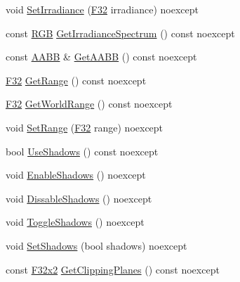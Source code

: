 \begin{DoxyCompactItemize}
void \mbox{\hyperlink{classmage_1_1rendering_1_1_directional_light_af8570b18bfb807492317e4a98f5c7ba6}{Set\+Irradiance}} (\mbox{\hyperlink{namespacemage_aa97e833b45f06d60a0a9c4fc22ae02c0}{F32}} irradiance) noexcept
\item 
const \mbox{\hyperlink{structmage_1_1_r_g_b}{R\+GB}} \mbox{\hyperlink{classmage_1_1rendering_1_1_directional_light_a3a99d3d63a686f8bc587015115a85a81}{Get\+Irradiance\+Spectrum}} () const noexcept
\item 
const \mbox{\hyperlink{classmage_1_1_a_a_b_b}{A\+A\+BB}} \& \mbox{\hyperlink{classmage_1_1rendering_1_1_directional_light_a0fdc09e70e3218f69de15c33436fc7ac}{Get\+A\+A\+BB}} () const noexcept
\item 
\mbox{\hyperlink{namespacemage_aa97e833b45f06d60a0a9c4fc22ae02c0}{F32}} \mbox{\hyperlink{classmage_1_1rendering_1_1_directional_light_a488b39bbc5f602fcc4aede228e971a18}{Get\+Range}} () const noexcept
\item 
\mbox{\hyperlink{namespacemage_aa97e833b45f06d60a0a9c4fc22ae02c0}{F32}} \mbox{\hyperlink{classmage_1_1rendering_1_1_directional_light_a62e8286172a0fe23878f23de2dded6cb}{Get\+World\+Range}} () const noexcept
\item 
void \mbox{\hyperlink{classmage_1_1rendering_1_1_directional_light_a4cfe435db538b10a6bc3aeab9c71dd45}{Set\+Range}} (\mbox{\hyperlink{namespacemage_aa97e833b45f06d60a0a9c4fc22ae02c0}{F32}} range) noexcept
\item 
bool \mbox{\hyperlink{classmage_1_1rendering_1_1_directional_light_a129904147256d111ec56cc3ddc502157}{Use\+Shadows}} () const noexcept
\item 
void \mbox{\hyperlink{classmage_1_1rendering_1_1_directional_light_abafdec9ce9ca0263724ce8ddba430b1b}{Enable\+Shadows}} () noexcept
\item 
void \mbox{\hyperlink{classmage_1_1rendering_1_1_directional_light_a7b0b25df35d2c1121bf08cb0a733b858}{Dissable\+Shadows}} () noexcept
\item 
void \mbox{\hyperlink{classmage_1_1rendering_1_1_directional_light_a34a939e192e857ac25f6d91dd773ec9b}{Toggle\+Shadows}} () noexcept
\item 
void \mbox{\hyperlink{classmage_1_1rendering_1_1_directional_light_a4a8aa135c9366993f6343b33cd4ed9e0}{Set\+Shadows}} (bool shadows) noexcept
\item 
const \mbox{\hyperlink{namespacemage_aee4759dedc8def6c6dec26b5c7eddf29}{F32x2}} \mbox{\hyperlink{classmage_1_1rendering_1_1_directional_light_a178b7c303793864eaa0d58c81256760d}{Get\+Clipping\+Planes}} () const noexcept

\end{DoxyCompactItemize}
